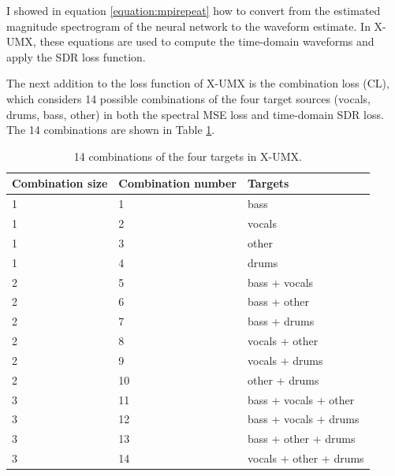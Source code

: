 \documentclass[report.tex]{subfiles}
\begin{document}
I showed in equation \eqref{equation:mpirepeat} how to convert from the estimated magnitude spectrogram of the neural network to the waveform estimate. In X-UMX, these equations are used to compute the time-domain waveforms and apply the SDR loss function.

The next addition to the loss function of X-UMX is the combination loss (CL), which considers 14 possible combinations of the four target sources (vocals, drums, bass, other) in both the spectral MSE loss and time-domain SDR loss. The 14 combinations are shown in Table \ref{table:14targets}.

\begin{table}[ht]
	\centering
	\caption{14 combinations of the four targets in X-UMX.}
	\label{table:14targets}
	\begin{tabular}{ |l|l|l| }
	 \hline
		Combination size & Combination number & Targets \\
	 \hline
	 \hline
	 	1 & 1 & bass \\
	 \hline
	 	1 & 2 & vocals \\
	 \hline
	 	1 & 3 & other \\
	 \hline
	 	1 & 4 & drums \\
	 \hline
	 	2 & 5 & bass + vocals \\
	 \hline
	 	2 & 6 & bass + other \\
	 \hline
	 	2 & 7 & bass + drums \\
	 \hline
	 	2 & 8 & vocals + other \\
	 \hline
	 	2 & 9 & vocals + drums \\
	 \hline
	 	2 & 10 & other + drums \\
	 \hline
	 	3 & 11 & bass + vocals + other \\
	 \hline
	 	3 & 12 & bass + vocals + drums \\
	 \hline
	 	3 & 13 & bass + other + drums \\
	 \hline
	 	3 & 14 & vocals + other + drums \\
	 \hline
\end{tabular}
\end{table}
\end{document}
